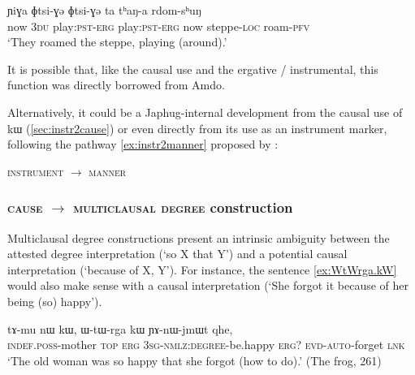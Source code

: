 \documentclass[oldfontcommands,oneside,a4paper,11pt]{article}
\newcommand{\ipa}[1]{{\phon #1}} %
\begin{document}
 \begin{exe} 
\ex \label{ex:erg.gerund.amdo}
\gll   \ipa{ta} 	\ipa{ɲiɣa} 	\ipa{ɸtsi-ɣə} 	\ipa{ɸtsi-ɣə} 	\ipa{ta} 	\ipa{tʰaŋ-a} 	\ipa{rdom-sʰuŋ}  \\
now \textsc{3du} play:\textsc{pst}-\textsc{erg} play:\textsc{pst}-\textsc{erg} now steppe-\textsc{loc} roam-\textsc{pfv} \\
\glt  `They roamed the steppe, playing (around).'
\end{exe}  

It is possible that, like the causal use and the ergative / instrumental, this function was directly borrowed from Amdo.

Alternatively, it could be a Japhug-internal development from the causal use of \ipa{kɯ}  (\ref{sec:instr2cause}) or even directly from its use as an instrument marker, following the pathway \ref{ex:instr2manner} proposed by \citet[180]{heine-kuteva02}:
   \begin{exe}
\ex \label{ex:instr2manner}
\glt \textsc{instrument} $\rightarrow$ \textsc{manner} 
\end{exe}

 

\subsubsection{\textsc{cause} $\rightarrow$ \textsc{multiclausal degree} construction} \label{sec:cause2degree}

Multiclausal degree constructions  present an intrinsic ambiguity between the attested degree interpretation (`so X that Y') and a potential causal interpretation (`because of X, Y').  For instance, the sentence \ref{ex:WtWrga.kW} would also make sense  with a causal interpretation (`She forgot it because of her being (so) happy').



 \begin{exe} 
 \ex \label{ex:WtWrga.kW}
\gll 
\ipa{tɤ-mu}  	\ipa{nɯ}  	\ipa{kɯ,}  	  	\ipa{ɯ-tɯ-rga}  	\ipa{kɯ}  	\ipa{ɲɤ-nɯ-jmɯt}  	\ipa{qhe,}  \\
\textsc{indef.poss}-mother \textsc{top} \textsc{erg} \textsc{3sg-nmlz:degree}-be.happy \textsc{erg?} \textsc{evd-auto}-forget  \textsc{lnk} \\
\glt `The old woman was so happy that she forgot (how to do).' (The frog, 261)
 \end{exe} 
 
 

% 
 
\end{document}
